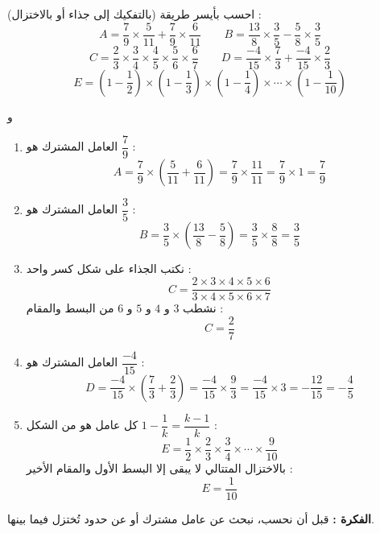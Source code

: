 \documentclass[12pt,a4paper]{article}
\begin{document}
\begin{corr}[title={حسابات ذكية}, stars=3, source={Axiomaths}]
احسب بأيسر طريقة (بالتفكيك إلى جذاء أو بالاختزال) :
\[A=\dfrac{7}{9}\times\dfrac{5}{11}+\dfrac{7}{9}\times\dfrac{6}{11}\qquad B=\dfrac{13}{8}\times\dfrac{3}{5}-\dfrac{5}{8}\times\dfrac{3}{5}\]
\[C=\dfrac{2}{3}\times\dfrac{3}{4}\times\dfrac{4}{5}\times\dfrac{5}{6}\times\dfrac{6}{7}\qquad D=\dfrac{-4}{15}\times\dfrac{7}{3}+\dfrac{-4}{15}\times\dfrac{2}{3}\]
\[E=\left(1-\dfrac{1}{2}\right)\times\left(1-\dfrac{1}{3}\right)\times\left(1-\dfrac{1}{4}\right)\times\cdots\times\left(1-\dfrac{1}{10}\right)\]
\axsol
\begin{prop}
 \qquad و \qquad {}
\end{prop}
\begin{enumerate}[itemsep=14pt]
  \item[$A$ :] العامل المشترك هو $\dfrac{7}{9}$ :
  \[A=\dfrac{7}{9}\times\left(\dfrac{5}{11}+\dfrac{6}{11}\right)=\dfrac{7}{9}\times\dfrac{11}{11}=\dfrac{7}{9}\times1=\dfrac{7}{9}\]
  \item[$B$ :] العامل المشترك هو $\dfrac{3}{5}$ :
  \[B=\dfrac{3}{5}\times\left(\dfrac{13}{8}-\dfrac{5}{8}\right)=\dfrac{3}{5}\times\dfrac{8}{8}=\dfrac{3}{5}\]
  \item[$C$ :] نكتب الجذاء على شكل كسر واحد :
  \[C=\dfrac{2\times3\times4\times5\times6}{3\times4\times5\times6\times7}\]
  نشطب $3$ و $4$ و $5$ و $6$ من البسط والمقام :
  \[C=\dfrac{2}{7}\]
  \item[$D$ :] العامل المشترك هو $\dfrac{-4}{15}$ :
  \[D=\dfrac{-4}{15}\times\left(\dfrac{7}{3}+\dfrac{2}{3}\right)=\dfrac{-4}{15}\times\dfrac{9}{3}=\dfrac{-4}{15}\times3=-\dfrac{12}{15}=-\dfrac{4}{5}\]
  \item[$E$ :] كل عامل هو من الشكل $1-\dfrac{1}{k}=\dfrac{k-1}{k}$ :
  \[E=\dfrac{1}{2}\times\dfrac{2}{3}\times\dfrac{3}{4}\times\cdots\times\dfrac{9}{10}\]
  بالاختزال المتتالي لا يبقى إلا البسط الأول والمقام الأخير :
  \[E=\dfrac{1}{10}\]
\end{enumerate}
\textbf{الفكرة :} قبل أن نحسب، نبحث عن عامل مشترك أو عن حدود تُختزل فيما بينها.
\end{corr}
\end{document}
